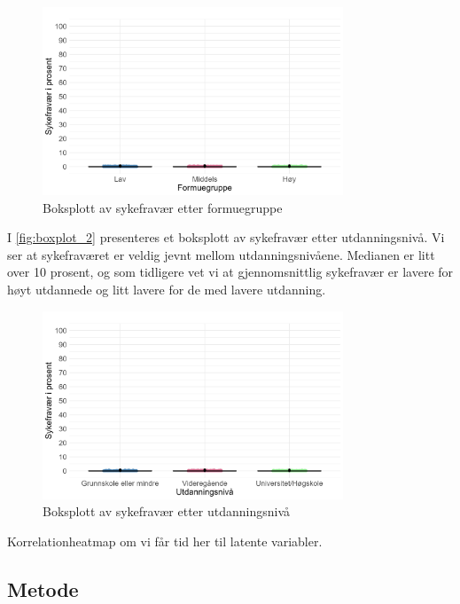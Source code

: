 \documentclass[
  12pt,
  a4paper,
  DIV=11,
  numbers=noendperiod]{scrartcl}
\begin{document}
\begin{figure}[H]
\caption{Boksplott av sykefravær etter formuegruppe}
\label{fig:boxplot}
\centering
\includegraphics[width=0.8\textwidth]{dokumentobjekter/figurer/fig_6.png}
\end{figure}

I \autoref{fig:boxplot_2} presenteres et boksplott av sykefravær etter
utdanningsnivå. Vi ser at sykefraværet er veldig jevnt mellom
utdanningsnivåene. Medianen er litt over 10 prosent, og som tidligere
vet vi at gjennomsnittlig sykefravær er lavere for høyt utdannede og
litt lavere for de med lavere utdanning.

\begin{figure}[H]
\caption{Boksplott av sykefravær etter utdanningsnivå}
\label{fig:boxplot_2}
\centering
\includegraphics[width=0.8\textwidth]{dokumentobjekter/figurer/fig_7.png}
\end{figure}

Korrelationheatmap om vi får tid her til latente variabler.

\subsection{Metode}\label{metode}
\end{document}
